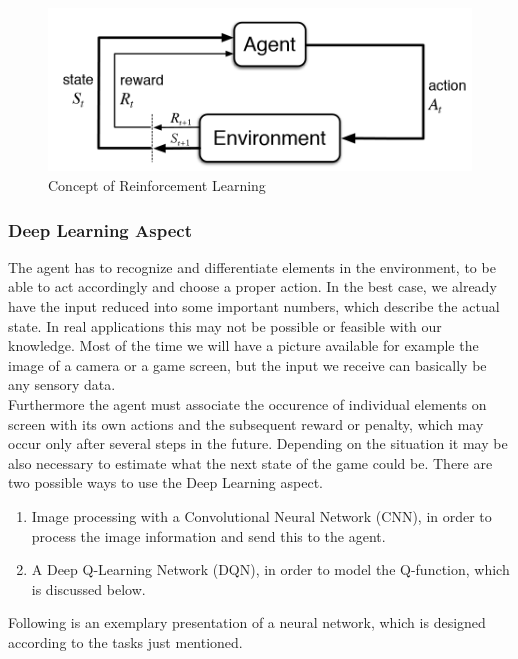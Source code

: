 		\begin{figure}[h!]
			\begin{center}
				\includegraphics[width=0.6\linewidth]{img/eoeSq.png}
				\caption{Concept of Reinforcement Learning}
				\label{concept}
			\end{center}
		\end{figure}

	\subsubsection{Deep Learning Aspect}
		The agent has to recognize and differentiate elements in the environment, to be able to act accordingly and choose a proper action. In the best case, we already have the input reduced into some important numbers, which describe the actual state. In real applications this may not be possible or feasible with our knowledge. Most of the time we will have a picture available for example the image of a camera or a game screen, but the input we receive can basically be any sensory data.\\
		
		Furthermore the agent must associate the occurence of individual elements on screen with its own actions and the subsequent reward or penalty, which may occur only after several steps in the future. Depending on the situation it may be also necessary to estimate what the next state of the game could be. There are two possible ways to use the Deep Learning aspect.
		
		\begin{enumerate}
			\item Image processing with a Convolutional Neural Network (CNN), in order to process the image information and send this to the agent.
			\item A Deep Q-Learning Network (DQN), in order to model the Q-function, which is discussed below.
		\end{enumerate}
	
		Following is an exemplary presentation of a neural network, which is designed according to the tasks just mentioned.
		
